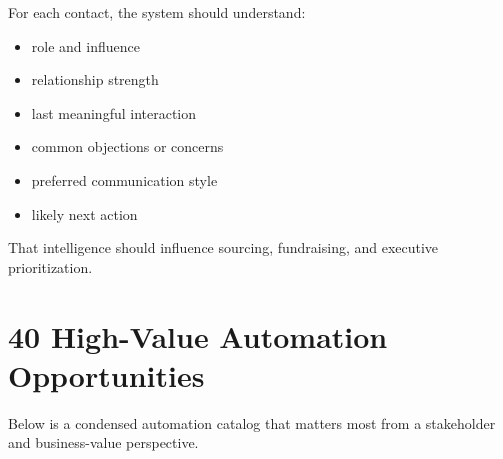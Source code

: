 \documentclass[11pt]{article}
\begin{document}
For each contact, the system should understand:

\begin{itemize}
\item role and influence
\item relationship strength
\item last meaningful interaction
\item common objections or concerns
\item preferred communication style
\item likely next action
\end{itemize}

That intelligence should influence sourcing, fundraising, and executive prioritization.

\section{40 High-Value Automation Opportunities}

Below is a condensed automation catalog that matters most from a stakeholder and business-value perspective.
\end{document}
